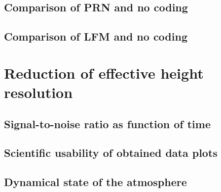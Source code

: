 \subsection{Comparison of PRN and no coding}

\subsection{Comparison of LFM and no coding}


\section{Reduction of effective height resolution}

\subsection{Signal-to-noise ratio as function of time}

\subsection{Scientific usability of obtained data plots}

\subsection{Dynamical state of the atmosphere}
